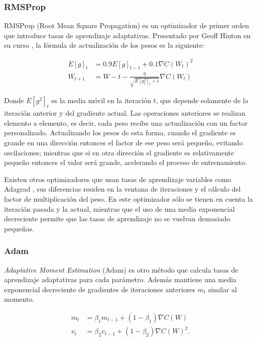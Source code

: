 \subsubsection{RMSProp}

RMSProp (Root Mean Square Propagation) es un optimizador de primer orden que introduce tasas de aprendizaje adaptativas. Presentado por Geoff Hinton en su curso \cite{rmsprop}, la fórmula de actualización de los pesos es la siguiente:

\begin{align*}
	E[g]_t &= 0.9 E[g]_{t-1} + 0.1 \nabla C(W_t)^{2}\\
	W_{t+1} &= W-t - \frac{\eta}{\sqrt{E[g_t^2]_t + \epsilon}}\nabla C(W_t)
\end{align*}

Donde $E[g^2]_t$ es la media móvil en la iteración $t$, que depende solamente de la iteración anterior y del gradiente actual. Las operaciones anteriores se realizan elemento a elemento, es decir, cada peso recibe una actualización con un factor personalizado. Actualizando los pesos de esta forma, cuando el gradiente es grande en una dirección entonces el factor de ese peso será pequeño, evitando oscilaciones; mientras que si en otra dirección el gradiente es relativamente pequeño entonces el valor será grande, acelerando el proceso de entrenamiento.

Existen otros optimizadores que usan tasas de aprendizaje variables como Adagrad \cite{adagrad}, sus diferencias residen en la ventana de iteraciones y el cálculo del factor de multiplicación del peso. En este optimizador sólo se tienen en cuenta la iteración pasada y la actual, mientras que el uso de una media exponencial decreciente permite que las tasas de aprendizaje no se vuelvan demasiado pequeñas.

\subsubsection{Adam}

\textit{Adaptative Moment Estimation} (Adam) \cite{Adam} es otro método que calcula tasas de aprendizaje adaptativas para cada parámetro. Además mantiene una media exponencial decreciente de gradientes de iteraciones anteriores $m_t$ similar al momento.

\begin{align*}
	m_t&= \beta_1 m_{t-1} + (1-\beta_1)\nabla C(W) \\
	v_t&= \beta_2 v_{t-1} + (1-\beta_2)\nabla C(W)^2.
\end{align*}


